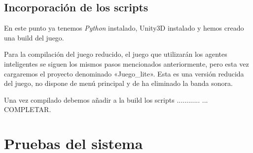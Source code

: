 \subsection{Incorporación de los scripts}
En este punto ya tenemos \emph{Python} instalado, Unity3D instalado y hemos creado una build del juego.

Para la compilación del juego reducido, el juego que utilizarán los agentes inteligentes se siguen los mismos pasos mencionados anteriormente, pero esta vez cargaremos el proyecto denominado «Juego\_lite». Esta es una versión reducida del juego, no dispone de menú principal y de ha eliminado la banda sonora.

Una vez compilado debemos añadir a la build los scripts ............ ... COMPLETAR.



\section{Pruebas del sistema}
